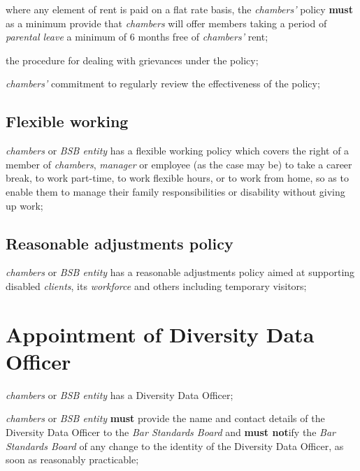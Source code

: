 \begin{numlist}
\begin{alphlist}
\begin{romlist}
\item where any element of rent is paid on a flat rate basis, the
\emph{chambers'} policy \textcolor{myred}{\textbf{must}} as a minimum provide that \emph{chambers}
will offer members taking a period of \emph{parental leave} a minimum of
6 months free of \emph{chambers'} rent;

\item the procedure for dealing with grievances under the policy;

\item \emph{chambers'} commitment to regularly review the effectiveness
of the policy;
\end{romlist}
\subsection{Flexible working}

\item \emph{chambers} or \emph{BSB entity} has a flexible working policy
which covers the right of a member of \emph{chambers}, \emph{manager} or
employee (as the case may be) to take a career break, to work part-time,
to work flexible hours, or to work from home, so as to enable them to
manage their family responsibilities or disability without giving up
work;

\subsection{Reasonable adjustments policy}

\item \emph{chambers} or \emph{BSB entity} has a reasonable adjustments
policy aimed at supporting disabled \emph{clients}, its \emph{workforce}
and others including temporary visitors;

\section{Appointment of Diversity Data Officer}

\item \emph{chambers} or \emph{BSB entity} has a Diversity Data Officer;

\item \emph{chambers} or \emph{BSB entity} \textcolor{myred}{\textbf{must}} provide the name and
contact details of the Diversity Data Officer to the \emph{Bar Standards
Board} and \textcolor{myred}{\textbf{must not}}ify the \emph{Bar Standards Board} of any change to
the identity of the Diversity Data Officer, as soon as reasonably
practicable;


\end{alphlist}
\end{numlist}
